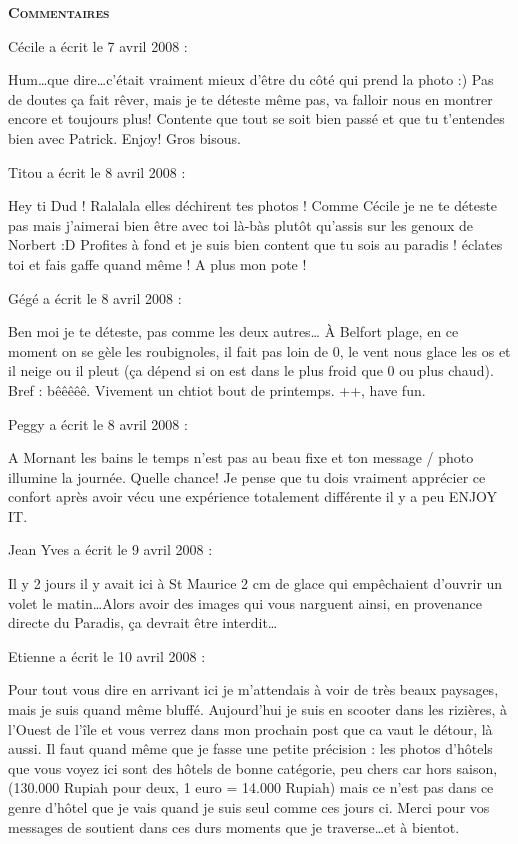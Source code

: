 \bigskip
\textbf{\textsc{Commentaires}}

\medskip
Cécile a écrit le 7 avril 2008 :
\begin{displayquote}
Hum\dots que dire\dots c'était vraiment mieux d'être du côté qui prend la photo :) Pas de doutes ça fait rêver, mais je te déteste même pas, va falloir nous en montrer encore et toujours plus!
Contente que tout se soit bien passé et que tu t'entendes bien avec Patrick. Enjoy!
Gros bisous.
\end{displayquote}

\medskip
Titou a écrit le 8 avril 2008 :
\begin{displayquote}
Hey ti Dud !
Ralalala elles déchirent tes photos ! Comme Cécile je ne te déteste pas mais j'aimerai bien être avec toi là-bàs plutôt qu'assis sur les genoux de Norbert :D
Profites à fond et je suis bien content que tu sois au paradis ! éclates toi et fais gaffe quand même !
A plus mon pote !
\end{displayquote}

\medskip
Gégé a écrit le 8 avril 2008 :
\begin{displayquote}
Ben moi je te déteste, pas comme les deux autres\dots
À Belfort plage, en ce moment on se gèle les roubignoles, il fait pas loin de 0, le vent nous glace les os et il neige ou il pleut (ça dépend si on est dans le plus froid que 0 ou plus chaud). Bref : bêêêêê.
Vivement un chtiot bout de printemps.
++, have fun.
\end{displayquote}

\medskip
Peggy a écrit le 8 avril 2008 :
\begin{displayquote}
A Mornant les bains le temps n'est pas au beau fixe et ton message / photo illumine la journée.
Quelle chance!
Je pense que tu dois vraiment apprécier ce confort après avoir vécu une expérience totalement différente il y a peu
ENJOY IT.
\end{displayquote}

\medskip
Jean Yves a écrit le 9 avril 2008 :
\begin{displayquote}
Il y 2 jours il y avait ici à St Maurice 2 cm de glace qui empêchaient d'ouvrir un volet le matin\dots Alors avoir des images qui vous narguent ainsi, en provenance directe du Paradis, ça devrait être interdit\dots
\end{displayquote}

\medskip
Etienne a écrit le 10 avril 2008 :
\begin{displayquote}
Pour tout vous dire en arrivant ici je m'attendais à voir de très beaux paysages, mais je suis quand même bluffé.
Aujourd'hui je suis en scooter dans les rizières, à l'Ouest de l'île et vous verrez dans mon prochain post que ca vaut le détour, là aussi.
Il faut quand même que je fasse une petite précision : les photos d'hôtels que vous voyez ici sont des hôtels de bonne catégorie, peu chers car hors saison, (130.000 Rupiah pour deux, 1 euro = 14.000 Rupiah) mais ce n'est pas dans ce genre d'hôtel que je vais quand je suis seul comme ces jours ci.
Merci pour vos messages de soutient dans ces durs moments que je traverse\dots et à bientot.
\end{displayquote}

